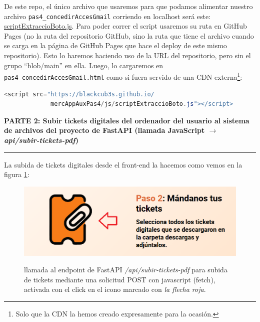 \documentclass[a4paper,12pt]{report}
\begin{document}
	De este repo, el único archivo que usaremos para que podamos alimentar nuestro archivo \texttt{pas4\_concedirAccesGmail} corriendo en localhost será este: \href{https://github.com/blackcub3s/mercAppAuxPas4/blob/main/js/scriptExtraccioBoto.js}{scriptExtraccioBoto.js}. Para poder correr el script usaremos su ruta en GitHub Pages (no la ruta del repositorio GitHub, sino la ruta que tiene el archivo cuando se carga en la página de GitHub Pages que hace el deploy de este mismo repositorio). Esto lo haremos haciendo uso de la URL del repositorio, pero sin el grupo ``blob/main'' en ella. Luego, lo cargaremos en \texttt{pas4\_concedirAccesGmail.html} como si fuera servido de una CDN externa\footnote{Solo que la CDN la hemos creado expresamente para la ocasión.}:
	
	\begin{lstlisting}[language=java, basicstyle=\ttfamily\small]
<script src="https://blackcub3s.github.io/
             mercAppAuxPas4/js/scriptExtraccioBoto.js"></script>
	\end{lstlisting}
	
	


	\noindent \textbf{PARTE 2: Subir tickets digitales del ordenador del usuario al sistema de archivos del proyecto de FastAPI (llamada JavaScript $\rightarrow$ \textit{api/subir-tickets-pdf})}
	\hrule
	\vspace{.5em}
	
	
	
	
	
	La subida de tickets digitales desde el front-end la hacemos como vemos en la figura \ref{fig:pujarticketspas5}:
	
	\FloatBarrier
	\begin{figure}[H]
		\centering
		\caption{llamada al endpoint de FastAPI \textit{/api/subir-tickets-pdf} para subida de tickets mediante una solicitud POST con javascript (fetch), activada con el click en el icono marcado con \textit{la flecha roja}.}
		\includegraphics[width=1\linewidth]{img/pujarTicketsPas5}
		\label{fig:pujarticketspas5}
	\end{figure}
	\FloatBarrier
	
\end{document}
